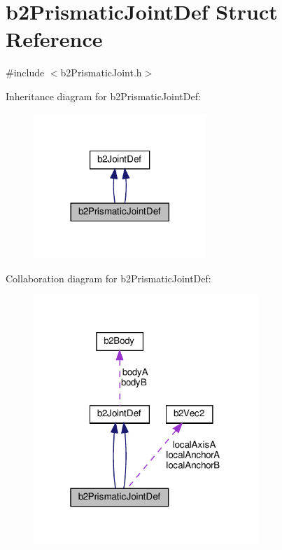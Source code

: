 \hypertarget{structb2PrismaticJointDef}{}\section{b2\+Prismatic\+Joint\+Def Struct Reference}
\label{structb2PrismaticJointDef}


{\ttfamily \#include $<$b2\+Prismatic\+Joint.\+h$>$}



Inheritance diagram for b2\+Prismatic\+Joint\+Def\+:
\nopagebreak
\begin{figure}[H]
\begin{center}
\leavevmode
\includegraphics[width=185pt]{structb2PrismaticJointDef__inherit__graph}
\end{center}
\end{figure}


Collaboration diagram for b2\+Prismatic\+Joint\+Def\+:
\nopagebreak
\begin{figure}[H]
\begin{center}
\leavevmode
\includegraphics[width=241pt]{structb2PrismaticJointDef__coll__graph}
\end{center}
\end{figure}
